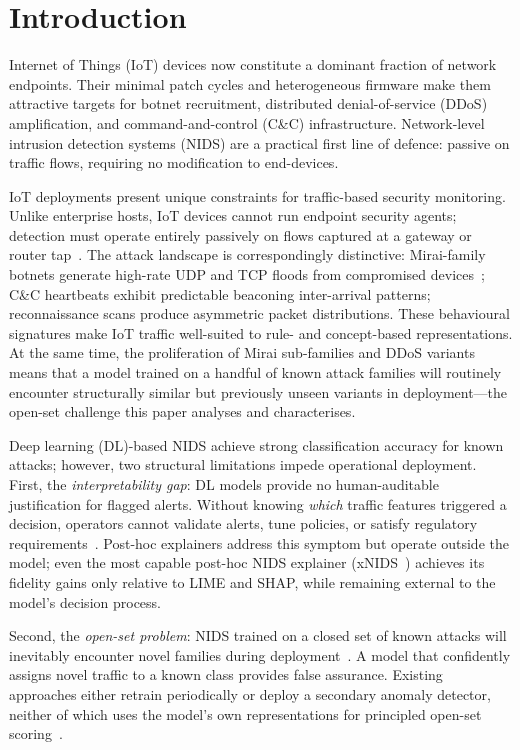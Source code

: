 \documentclass[journal]{IEEEtran}
\begin{document}
\section{Introduction}

Internet of Things (IoT) devices now constitute a dominant fraction of
network endpoints. Their minimal patch cycles and heterogeneous firmware
make them attractive targets for botnet recruitment, distributed
denial-of-service (DDoS) amplification, and command-and-control (C\&C)
infrastructure. Network-level intrusion detection systems (NIDS) are a
practical first line of defence: passive on traffic flows, requiring no
modification to end-devices.

IoT deployments present unique constraints for traffic-based security
monitoring. Unlike enterprise hosts, IoT devices cannot run endpoint
security agents; detection must operate entirely passively on flows
captured at a gateway or router tap~\cite{mirsky2018kitsune}. The attack
landscape is correspondingly distinctive: Mirai-family botnets generate
high-rate UDP and TCP floods from compromised devices~\cite{meidan2018nbaiot};
C\&C heartbeats exhibit predictable beaconing inter-arrival patterns;
reconnaissance scans produce asymmetric packet distributions. These
behavioural signatures make IoT traffic well-suited to rule- and
concept-based representations. At the same time, the proliferation of
Mirai sub-families and DDoS variants means that a model trained on a
handful of known attack families will routinely encounter structurally
similar but previously unseen variants in deployment---the open-set
challenge this paper analyses and characterises.

Deep learning (DL)-based NIDS achieve strong classification accuracy
for known attacks; however, two structural limitations impede
operational deployment. First, the \emph{interpretability gap}: DL
models provide no human-auditable justification for flagged alerts.
Without knowing \emph{which} traffic features triggered a decision,
operators cannot validate alerts, tune policies, or satisfy regulatory
requirements~\cite{rudin2019stop,arp2022dos}. Post-hoc explainers
address this symptom but operate outside the model; even the most
capable post-hoc NIDS explainer (xNIDS~\cite{wei2023xnids}) achieves
its fidelity gains only relative to LIME and SHAP, while remaining
external to the model's decision process.

Second, the \emph{open-set problem}: NIDS trained on a closed set of
known attacks will inevitably encounter novel families during
deployment~\cite{arp2022dos}. A model that confidently assigns novel
traffic to a known class provides false assurance. Existing approaches
either retrain periodically or deploy a secondary anomaly detector,
neither of which uses the model's own representations for principled
open-set scoring~\cite{han2023owad}.
\end{document}
